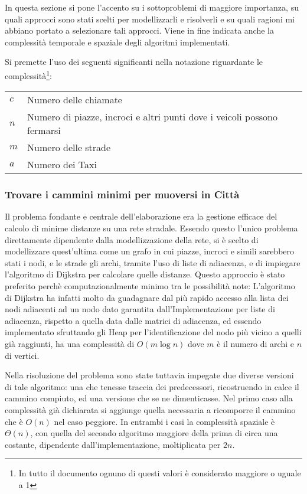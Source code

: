 \documentclass[a4paper,11pt]{Article}
\begin{document}
In questa sezione si pone l'accento su i sottoproblemi di maggiore importanza, su quali approcci sono stati scelti per modellizzarli e risolverli e su quali ragioni mi abbiano portato a selezionare tali approcci. Viene in fine indicata anche la complessità temporale e spaziale degli algoritmi implementati.

Si premette l'uso dei seguenti significanti nella notazione riguardante le complessità\footnote{In tutto il documento ognuno di questi valori è considerato maggiore o uguale a 1}:

\begin{tabular}{p{1.75cm}p{10cm}p{1cm}}
$c$ & Numero delle chiamate \\
$n$ & Numero di piazze, incroci e altri punti dove i veicoli possono fermarsi\\
$m$ & Numero delle strade\\
$a$ & Numero dei Taxi \\
\end{tabular}

\subsubsection{Trovare i cammini minimi per muoversi in Città}

Il problema fondante e centrale dell'elaborazione era la gestione efficace del calcolo di minime distanze su una rete stradale. Essendo questo l'unico problema direttamente dipendente dalla modellizzazione della rete, si è scelto di modellizzare quest'ultima come un grafo in cui piazze, incroci e simili sarebbero stati i nodi, e le strade gli archi, tramite l'uso di liste di adiacenza, e di impiegare l'algoritmo di Dijkstra per calcolare quelle distanze. Questo approccio è stato preferito perchè computazionalmente minimo tra le possibilità note: L'algoritmo di Dijkstra ha infatti molto da guadagnare dal più rapido accesso alla lista dei nodi adiacenti ad un nodo dato garantita dall'Implementazione per liste di adiacenza, rispetto a quella data dalle matrici di adiacenza, ed essendo implementato sfruttando gli Heap per l'identificazione del nodo più vicino a quelli già raggiunti, ha una complessità di $O(m\log{n})$ dove $m$ è il numero di archi e $n$ di vertici.

Nella risoluzione del problema sono state tuttavia impegate due diverse versioni di tale algoritmo: una che tenesse traccia dei predecessori, ricostruendo in calce il cammino compiuto, ed una versione che se ne dimenticasse.
Nel primo caso alla complessità già dichiarata si aggiunge quella necessaria a ricomporre il cammino che è $O(n)$ nel caso peggiore.
In entrambi i casi la complessità spaziale è $\Theta(n)$, con quella del secondo algoritmo maggiore della prima di circa una costante, dipendente dall'implementazione, moltiplicata per $2n$.
\end{document}
